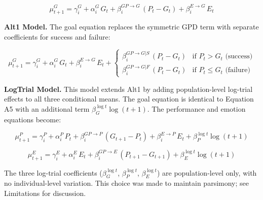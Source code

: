 \documentclass[
  man,
  floatsintext,
  longtable,
  nolmodern,
  notxfonts,
  notimes,
  colorlinks=true,linkcolor=blue,citecolor=blue,urlcolor=blue]{apa7}
\begin{document}
\[
\mu^G_{t+1} = \gamma^G_i + \alpha^G_i \, G_t + \beta^{GP \to G}_i \,(P_t - G_t) + \beta^{E \to G}_i \, E_t \tag{A4}
\]

\textbf{Alt1 Model.} The goal equation replaces the symmetric GPD term
with separate coefficients for success and failure:

\[
\mu^G_{t+1} = \gamma^G_i + \alpha^G_i \, G_t + \beta^{E \to G}_i \, E_t +
\begin{cases}
\beta^{GP \to G|S}_i\,(P_t - G_t) & \text{if } P_t > G_t \text{ (success)} \\
\beta^{GP \to G|F}_i \,(P_t - G_t) & \text{if } P_t \leq G_t \text{ (failure)}
\end{cases}
\tag{A5}
\]

\textbf{LogTrial Model.} This model extends Alt1 by adding
population-level log-trial effects to all three conditional means. The
goal equation is identical to Equation A5 with an additional term
\(\beta^{\log t}_G \log(t+1)\). The performance and emotion equations
become:

\[
\mu^P_{t+1} = \gamma^P_i + \alpha^P_i \, P_t + \beta^{GP \to P}_i \,(G_{t+1} - P_t) + \beta^{E \to P}_i \, E_t + \beta^{\log t}_P \log(t+1) \tag{A6}
\]

\[
\mu^E_{t+1} = \gamma^E_i + \alpha^E_i \, E_t + \beta^{GP \to E}_i \,(P_{t+1} - G_{t+1}) + \beta^{\log t}_E \log(t+1) \tag{A7}
\]

The three log-trial coefficients (\(\beta^{\log t}_G\),
\(\beta^{\log t}_P\), \(\beta^{\log t}_E\)) are population-level only,
with no individual-level variation. This choice was made to maintain
parsimony; see Limitations for discussion.
\end{document}
